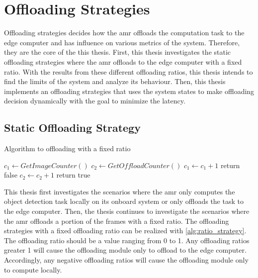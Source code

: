 \section{Offloading Strategies}\label{sec:general_setup:offloading_strategies}

Offloading strategies decides how the \gls{amr} offloads the computation task to the edge computer and has influence on various metrics of the system. Therefore, they are the core of the this thesis. First, this thesis investigates the static offloading strategies where the \gls{amr} offloads to the edge computer with a fixed ratio. With the results from these different offloading ratios, this thesis intends to find the limits of the system and analyze its behaviour. Then, this thesis implements an offloading strategies that uses the system states to make offloading decision dynamically with the goal to minimize the latency. 

\subsection{Static Offloading Strategy}

\begin{algorithm}[htp]
\caption{Algorithm to offloading with a fixed ratio}\label{alg:ratio_strategy}
\begin{algorithmic}[1]
        \State $c_1 \gets GetImageCounter()$
        \State $c_2 \gets GetOffloadCounter()$
        \State $c_1 \gets c_1 + 1$
            \State return false 
        \Else
            \State $c_2 \gets c_2 + 1$
            \State return true 
        \EndIf
    \EndFunction
\end{algorithmic}
\end{algorithm}

This thesis first investigates the scenarios where the \gls{amr} only computes the object detection task locally on its onboard system or only offloads the task to the edge computer. Then, the thesis continues to investigate the scenarios where the \gls{amr} offloads a portion of the frames with a fixed ratio. The offloading strategies with a fixed offloading ratio can be realized with \cref{alg:ratio_strategy}. The offloading ratio should be a value ranging from 0 to 1. Any offloading ratios greater 1 will cause the offloading module only to offload to the edge computer. Accordingly, any negative offloading ratios will cause the offloading module only to compute locally.

